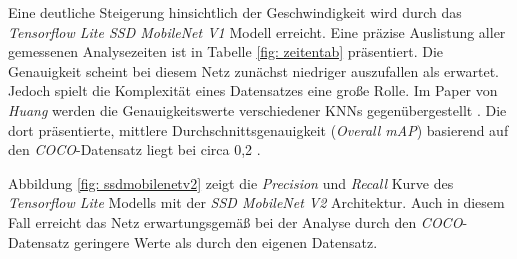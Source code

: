 

Eine deutliche Steigerung hinsichtlich der Geschwindigkeit wird durch das \textit{Tensorflow Lite SSD MobileNet V1} Modell erreicht. Eine präzise Auslistung aller gemessenen Analysezeiten ist in Tabelle \ref{fig: zeitentab} präsentiert. Die Genauigkeit scheint bei diesem Netz zunächst niedriger auszufallen als erwartet. Jedoch spielt die Komplexität eines Datensatzes eine große Rolle. Im Paper von \textit{Huang} werden die Genauigkeitswerte verschiedener KNNs gegenübergestellt \cite{maxssdmobilenet}. Die dort präsentierte, mittlere Durchschnittsgenauigkeit (\textit{Overall mAP}) basierend auf den \textit{COCO}-Datensatz liegt bei circa 0,2 \cite{maxssdmobilenet}. 





Abbildung \ref{fig: ssdmobilenetv2} zeigt die \textit{Precision} und \textit{Recall} Kurve des \textit{Tensorflow Lite} Modells mit der \textit{SSD MobileNet V2} Architektur. Auch in diesem Fall erreicht das Netz erwartungsgemäß bei der Analyse durch den \textit{COCO}-Datensatz geringere Werte als durch den eigenen Datensatz. 

   







